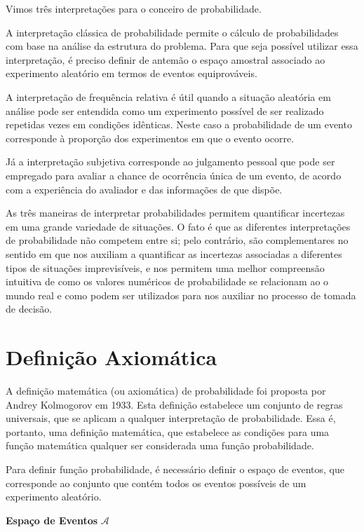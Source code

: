 \documentclass[
]{book}
\theoremstyle{definition}
\theoremstyle{definition}
\theoremstyle{definition}
\theoremstyle{remark}
\begin{document}
Vimos três interpretações para o conceiro de probabilidade.

A interpretação clássica de probabilidade permite o cálculo de probabilidades com base na análise da estrutura do problema. Para que seja possível utilizar essa interpretação, é preciso definir de antemão o espaço amostral associado ao experimento aleatório em termos de eventos equiprováveis.

A interpretação de frequência relativa é útil quando a situação aleatória em análise pode ser entendida como um experimento possível de ser realizado repetidas vezes em condições idênticas. Neste caso a probabilidade de um evento corresponde à proporção dos experimentos em que o evento ocorre.

Já a interpretação subjetiva corresponde ao julgamento pessoal que pode ser empregado para avaliar a chance de ocorrência única de um evento, de acordo com a experiência do avaliador e das informações de que dispõe.

As três maneiras de interpretar probabilidades permitem quantificar incertezas em uma grande variedade de situações. O fato é que as diferentes interpretações de probabilidade não competem entre si; pelo contrário, são complementares no sentido em que nos auxiliam a quantificar as incertezas associadas a diferentes tipos de situações imprevisíveis, e nos permitem uma melhor compreensão intuitiva de como os valores numéricos de probabilidade se relacionam ao o mundo real e como podem ser utilizados para nos auxiliar no processo de tomada de decisão.

\hypertarget{definiuxe7uxe3o-axiomuxe1tica}{%
\section{Definição Axiomática}\label{definiuxe7uxe3o-axiomuxe1tica}}

A definição matemática (ou axiomática) de probabilidade foi proposta por Andrey Kolmogorov em 1933. Esta definição estabelece um conjunto de regras universais, que se aplicam a qualquer interpretação de probabilidade. Essa é, portanto, uma definição matemática, que estabelece as condições para uma função matemática qualquer ser considerada uma função probabilidade.

Para definir função probabilidade, é necessário definir o espaço de eventos, que corresponde ao conjunto que contém todos os eventos possíveis de um experimento aleatório.

\textbf{Espaço de Eventos} \(\mathcal{A}\)
\end{document}
